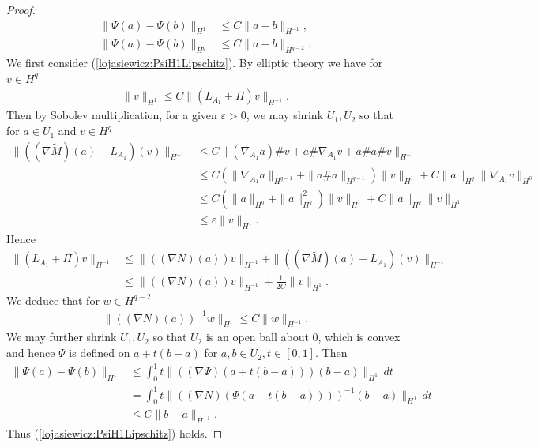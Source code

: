 \documentclass[12pt]{amsart}
\renewcommand{\1}{{\mathbf 1}}
\theoremstyle{others}
\numberwithin{equation}{section}
\begin{document}
\begin{proof}
    \begin{align}
        \|\Psi(a) - \Psi(b)\|_{H^1} &\leq C\|a - b\|_{H^{-1}}, \label{lojasiewicz:PsiH1Lipschitz} \\
        \|\Psi(a) - \Psi(b)\|_{H^q} &\leq C\|a - b\|_{H^{q-2}}. \label{lojasiewicz:PsiHqLipschitz}
    \end{align} We first consider (\ref{lojasiewicz:PsiH1Lipschitz}). By elliptic theory we have for \(v \in H^q\)
    \begin{align*}
        \|v\|_{H^1} \leq C\|(L_{A_1}+\Pi)v\|_{H^{-1}}.
    \end{align*} Then by Sobolev multiplication, for a given \(\varepsilon > 0\), we may shrink \(U_1, U_2\) so that for \(a \in U_1\) and \(v \in H^q\)
    \begin{align*}
        \|((\nabla \tilde{M})(a) - L_{A_1})(v)\|_{H^{-1}} &\leq C\|(\nabla_{A_1} a) \# v + a \# \nabla_{A_1} v + a \# a \# v\|_{H^{-1}} \\
        &\leq C(\|\nabla_{A_1} a\|_{H^{q-1}} + \|a \# a\|_{H^{q-1}})\|v\|_{H^1} + C\|a\|_{H^q}\|\nabla_{A_1} v\|_{H^0} \\
        &\leq C(\|a\|_{H^{q}} + \|a\|_{H^{q}}^2)\|v\|_{H^1} + C\|a\|_{H^q}\|v\|_{H^1} \\
        &\leq \varepsilon \|v\|_{H^1}.
    \end{align*} Hence
    \begin{align*}
         \|(L_{A_1}+\Pi)v\|_{H^{-1}} &\leq \|((\nabla N)(a))v\|_{H^{-1}} + \|((\nabla \tilde{M})(a) - L_{A_1})(v)\|_{H^{-1}} \\
         &\leq \|((\nabla N)(a))v\|_{H^{-1}} + \frac{1}{2C}\|v\|_{H^1}.
    \end{align*} We deduce that for \(w \in H^{q-2}\)
    \begin{align*}
        \|((\nabla N)(a))^{-1} w\|_{H^1} \leq C\|w\|_{H^{-1}}.
    \end{align*} We may further shrink \(U_1, U_2\) so that \(U_2\) is an open ball about \(0\), which is convex and hence \(\Psi\) is defined on \(a + t(b-a)\) for \(a, b \in U_2, t\in [0, 1]\). Then
    \begin{align*}
        \|\Psi(a) - \Psi(b)\|_{H^1} &\leq \int_0^1 t\|((\nabla \Psi)(a + t(b-a)))(b-a)\|_{H^1} \, dt  \\
        &= \int_0^1 t\|((\nabla N)(\Psi(a + t(b-a))))^{-1}(b-a)\|_{H^1} \, dt \\
        &\leq C\|b-a\|_{H^{-1}}.
    \end{align*} Thus (\ref{lojasiewicz:PsiH1Lipschitz}) holds. \par 

\end{proof}
\end{document}
